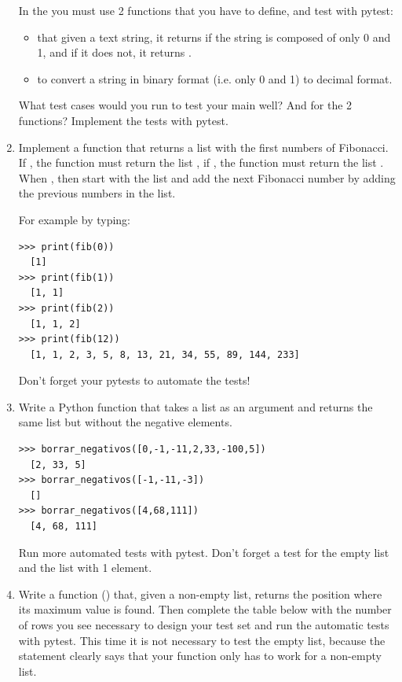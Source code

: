 \documentclass[
  fontsize=10pt,
  a4paper,
]{scrartcl}
\begin{document}
\begin{enumerate}
In the  you must use 2 functions that you have to define, and test with pytest:

\begin{itemize}
\item {} that given a text string, it returns  if the string is composed of only 0 and 1, and if it does not, it returns .
\item {} to convert a string in binary format (i.e. only 0 and 1) to decimal format.
\end{itemize}

What test cases would you run to test your main well?
And for the 2 functions? Implement the tests with pytest.


\item Implement a function  that returns a list with the first  numbers of Fibonacci. If , the function must return the list \pythoninline{[1]}, if , the function must return the list \pythoninline {[1,1]}. When , then start with the list \pythoninline {[1,1]} and add the next Fibonacci number by adding the previous numbers in the list.

For example by typing:

\begin{Verbatim}[frame=single]
>>> print(fib(0))
  [1]
>>> print(fib(1))
  [1, 1]
>>> print(fib(2))
  [1, 1, 2]
>>> print(fib(12))
  [1, 1, 2, 3, 5, 8, 13, 21, 34, 55, 89, 144, 233]
\end{Verbatim}

Don't forget your pytests to automate the tests!

\item Write a Python function  that takes a list as an argument and returns the same list but without the negative elements.

\begin{Verbatim}[frame=single]
>>> borrar_negativos([0,-1,-11,2,33,-100,5])
  [2, 33, 5]
>>> borrar_negativos([-1,-11,-3])
  []
>>> borrar_negativos([4,68,111])
  [4, 68, 111]
\end{Verbatim}

Run more automated tests with pytest. Don't forget a test for the empty list and the list with 1 element.

\item Write a function () that, given a non-empty list, returns the position where its maximum value is found.
Then complete the table below with the number of rows you see necessary to design your test set and run the automatic tests with pytest. This time it is not necessary to test the empty list, because the statement clearly says that your function only has to work for a non-empty list.\\


\end{enumerate}
\end{document}
